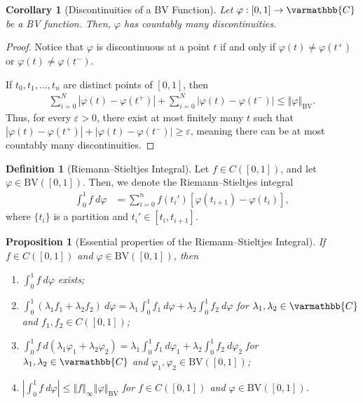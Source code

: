 \documentclass[12pt]{extarticle}
\newcommand{\C}{\mathbb{C}}
\newcommand{\norm}[1]{\left\Vert #1\right\Vert}
\newcommand{\ve}{\varepsilon}
\theoremstyle{plain}
\newtheorem*{corollary}{Corollary}
\newtheorem*{proposition}{Proposition}
\theoremstyle{definition}
\newtheorem*{definition}{Definition}
\theoremstyle{note}
\renewcommand*{\mathbb}[1]{\varmathbb{#1}}
\renewcommand{\newline}{\hfill\break}
\begin{document}
\begin{corollary}[Discontinuities of a BV Function]
  Let $\varphi: [0,1]\rightarrow \C$ be a BV function. Then, $\varphi$ has countably many discontinuities.
\end{corollary}
\begin{proof}
  Notice that $\varphi$ is discontinuous at a point $t$ if and only if $\varphi(t) \neq \varphi\left(t^{+}\right)$ or $\varphi(t) \neq \varphi\left(t^{-}\right)$.\newline

  If $t_0,t_1,\dots,t_n$ are distinct points of $[0,1]$, then
  \begin{align*}
    \sum_{i=0}^{N}\left\vert \varphi(t) - \varphi(t^{+}) \right\vert + \sum_{i=0}^{N}\left\vert \varphi(t) - \varphi(t^{-}) \right\vert \leq \norm{\varphi}_{\text{BV}}.
  \end{align*}
  Thus, for every $\ve > 0$, there exist at most finitely many $t$ such that $\left\vert \varphi(t) - \varphi\left(t^{+}\right) \right\vert + \left\vert \varphi(t) - \varphi(t^{-}) \right\vert \geq \ve$, meaning there can be at most countably many discontinuities.
\end{proof}
\begin{definition}[Riemann--Stieltjes Integral]
  Let $f\in C([0,1])$, and let $\varphi \in \text{BV}\left([0,1]\right)$. Then, we denote the Riemann--Stieltjes integral
  \begin{align*}
    \int_{0}^{1}f\:d\varphi &= \sum_{i=0}^{n}f\left(t_i'\right)\left[\varphi\left(t_{i+1}\right) - \varphi\left(t_i\right)\right],
  \end{align*}
  where $\{t_i\}$ is a partition and $t_i'\in [t_i,t_{i+1}]$.
\end{definition}
\begin{proposition}[Essential properties of the Riemann--Stieltjes Integral]
  If $f\in C([0,1])$ and $\varphi\in \text{BV}\left([0,1]\right)$, then
  \begin{enumerate}[(1)]
    \item $\displaystyle \int_{0}^{1} f\:d\varphi$ exists;
    \item $\displaystyle \int_{0}^{1} \left(\lambda_1f_1 + \lambda_2f_2\right)\:d\varphi = \lambda_1 \int_{0}^{1} f_1\:d\varphi + \lambda_2 \int_{0}^{1} f_2\:d\varphi$ for $\lambda_1,\lambda_2\in \C$ and $f_1,f_2 \in C([0,1])$;
    \item $\displaystyle \int_{0}^{1} f\:d\left(\lambda_1\varphi_1 + \lambda_2\varphi_2\right) = \lambda_1\int_{0}^{1} f_1\:d\varphi_1 + \lambda_2 \int_{0}^{1} f_2\:d\varphi_2$ for $\lambda_1,\lambda_2\in \C$ and $\varphi_1,\varphi_2\in \text{BV}\left([0,1]\right)$;
    \item $\displaystyle \left\vert \int_{0}^{1} f\:d\varphi \right\vert \leq \norm{f}_{\infty}\norm{\varphi}_{\text{BV}}$ for $f\in C\left([0,1]\right)$ and $\varphi \in \text{BV}\left([0,1]\right)$.
  \end{enumerate}
\end{proposition}
\end{document}
